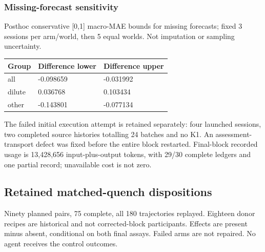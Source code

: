 \documentclass[10pt,a4paper]{article}
\begin{document}
\subsubsection{Missing-forecast sensitivity}\label{missing-forecast-sensitivity}

Posthoc conservative {[}0,1{]} macro-MAE bounds for missing forecasts; fixed 3 sessions per arm/world, then 5 equal worlds. Not imputation or sampling uncertainty.

{\def\LTcaptype{table} %
\small\begin{longtable}[]{@{}lll@{}}
\toprule\noalign{}
Group & Difference lower & Difference upper \\
\midrule\noalign{}
\endhead
\bottomrule\noalign{}
\endlastfoot
all & -0.098659 & -0.031992 \\
dilute & 0.036768 & 0.103434 \\
other & -0.143801 & -0.077134 \\
\end{longtable}\normalsize
}

The failed initial execution attempt is retained separately: four launched sessions, two completed source histories totalling 24 batches and no K1. An assessment-transport defect was fixed before the entire block restarted. Final-block recorded usage is 13,428,656 input-plus-output tokens, with 29/30 complete ledgers and one partial record; unavailable cost is not zero.

\subsection{Retained matched-quench dispositions}\label{retained-matched-quench-dispositions}

Ninety planned pairs, 75 complete, all 180 trajectories replayed. Eighteen donor recipes are historical and not corrected-block participants. Effects are present minus absent, conditional on both final assays. Failed arms are not repaired. No agent receives the control outcomes.
\end{document}
